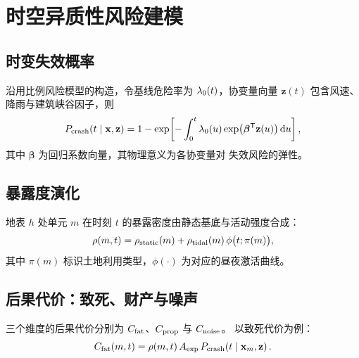 
\section{时空异质性风险建模}
\label{sec:risk-model}

\subsection{时变失效概率}

沿用比例风险模型的构造，令基线危险率为 $\lambda_0(t)$，协变量向量
$\mathbf{z}(t)$ 包含风速、降雨与建筑峡谷因子，则
\begin{equation}
  P_{\mathrm{crash}}\!\left(t \mid \mathbf{x}, \mathbf{z}\right)
    = 1 - \exp\!\left[-\int_{0}^{t} \lambda_0(u)
      \exp\bigl(\boldsymbol{\beta}^{\mathsf{T}} \mathbf{z}(u)\bigr) \, \mathrm{d}u\right],
  \label{eq:hazard}
\end{equation}
其中 $\boldsymbol{\beta}$ 为回归系数向量，其物理意义为各协变量对
失效风险的弹性。


\subsection{暴露度演化}

地表 $h$ 处单元 $m$ 在时刻 $t$ 的暴露密度由静态基底与活动强度合成：
\begin{equation}
  \rho(m, t) = \rho_{\mathrm{static}}(m)
    + \rho_{\mathrm{tidal}}(m) \, \phi\bigl(t; \pi(m)\bigr),
  \label{eq:exposure}
\end{equation}
其中 $\pi(m)$ 标识土地利用类型，$\phi(\cdot)$ 为对应的昼夜激活曲线。

\subsection{后果代价：致死、财产与噪声}

三个维度的后果代价分别为 $C_{\mathrm{fat}}$、$C_{\mathrm{prop}}$ 与 $C_{\mathrm{noise}}$。
以致死代价为例：
\begin{equation}
  C_{\mathrm{fat}}(m, t) = \rho(m, t) \, A_{\mathrm{exp}}
    \, P_{\mathrm{crash}}\!\left(t \mid \mathbf{x}_m, \mathbf{z}\right).
  \label{eq:casualty}
\end{equation}

